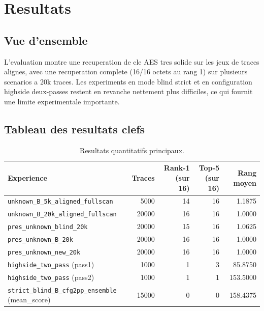 
\section{Resultats}

\subsection{Vue d'ensemble}
L'evaluation montre une recuperation de cle AES tres solide sur les jeux de traces alignes, avec une recuperation complete (16/16 octets au rang 1) sur plusieurs scenarios a 20k traces. Les experiments en mode blind strict et en configuration highside deux-passes restent en revanche nettement plus difficiles, ce qui fournit une limite experimentale importante.

\subsection{Tableau des resultats clefs}
\begin{table}[h]
\centering
\begin{tabular}{lrrrr}
\toprule
Experience & Traces & Rank-1 (sur 16) & Top-5 (sur 16) & Rang moyen \\
\midrule
\texttt{unknown\_B\_5k\_aligned\_fullscan} & 5000 & 14 & 16 & 1.1875 \\
\texttt{unknown\_B\_20k\_aligned\_fullscan} & 20000 & 16 & 16 & 1.0000 \\
\texttt{pres\_unknown\_blind\_20k} & 20000 & 15 & 16 & 1.0625 \\
\texttt{pres\_unknown\_B\_20k} & 20000 & 16 & 16 & 1.0000 \\
\texttt{pres\_unknown\_new\_20k} & 20000 & 16 & 16 & 1.0000 \\
\texttt{highside\_two\_pass} (pass1) & 1000 & 1 & 3 & 85.8750 \\
\texttt{highside\_two\_pass} (pass2) & 1000 & 1 & 1 & 153.5000 \\
\texttt{strict\_blind\_B\_cfg2pp\_ensemble} (mean\_score) & 15000 & 0 & 0 & 158.4375 \\
\bottomrule
\end{tabular}
\caption{Resultats quantitatifs principaux.}
\label{tab:resultats-clefs}
\end{table}

